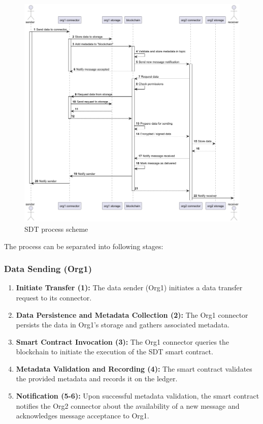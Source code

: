 \documentclass[10pt]{llncs}
\begin{document}
\begin{figure}
    \includegraphics[width=\textwidth]{sending_process.png}
    \caption{SDT process scheme} \label{sending_process}
\end{figure}

The process can be separated into following stages:

\subsubsection{Data Sending (Org1)}

\begin{enumerate}
    \item \textbf{Initiate Transfer (1):} The data sender (Org1) initiates a data transfer request to its connector.
    \item \textbf{Data Persistence and Metadata Collection (2):} The Org1 connector persists the data in Org1's storage and gathers associated metadata.
    \item \textbf{Smart Contract Invocation (3):} The Org1 connector queries the blockchain to initiate the execution of the SDT smart contract.
    \item \textbf{Metadata Validation and Recording (4):} The smart contract validates the provided metadata and records it on the ledger.
    \item \textbf{Notification (5-6):} Upon successful metadata validation, the smart contract notifies the Org2 connector about the availability of a new message and acknowledges message acceptance to Org1.
\end{enumerate}
\end{document}
